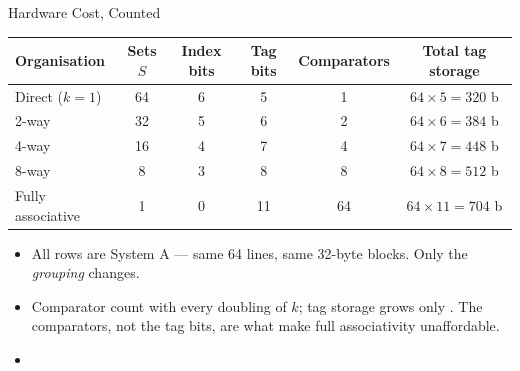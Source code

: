 \documentclass[aspectratio=169]{beamer}
\begin{document}
\begin{frame}{Hardware Cost, Counted}
  \footnotesize
  \begin{center}
  \begin{tabular}{@{}lccccc@{}}
    \toprule
    \textbf{Organisation} & \textbf{Sets $S$} & \textbf{Index bits} &
    \textbf{Tag bits} & \textbf{Comparators} & \textbf{Total tag storage} \\
    \midrule
    Direct ($k{=}1$)      & 64 & 6 & 5  & 1  & $64\times5 = 320$ b \\
    2-way                 & 32 & 5 & 6  & 2  & $64\times6 = 384$ b \\
    4-way                 & 16 & 4 & 7  & 4  & $64\times7 = 448$ b \\
    8-way                 & 8  & 3 & 8  & 8  & $64\times8 = 512$ b \\
    Fully associative     & 1  & 0 & 11 & 64 & $64\times11 = 704$ b \\
    \bottomrule
  \end{tabular}
  \end{center}
  \vspace{0.25cm}
  \normalsize
  \begin{itemize}
    \item All rows are System A --- same 64 lines, same 32-byte blocks. Only
      the \emph{grouping} changes.
    \item Comparator count  with every doubling of $k$; tag
      storage grows only . The comparators, not the tag
      bits, are what make full associativity unaffordable.
    \item {}
  \end{itemize}
\end{frame}
\end{document}
